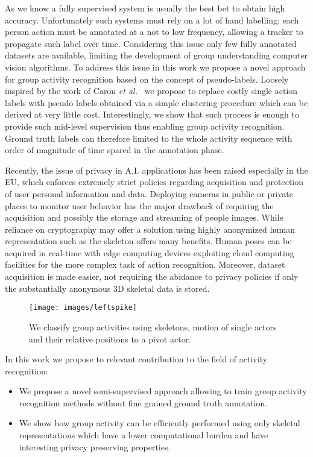 \documentclass[a4paper,conference]{IEEEtran}
\newcommand{\etal}{\textit{et al.}~}
\begin{document}
As we know a fully supervised system is usually the best bet to obtain high accuracy. Unfortunately such systems must rely on a lot of hand labelling: each person action must be annotated at a not to low frequency, allowing a tracker to propagate such label over time. Considering this issue only few fully annotated datasets are available, limiting the development of group understanding computer vision algorithms. To address this issue in this work we propose a novel approach for group activity recognition based on the concept of pseudo-labels. Loosely inspired by the work of Caron \etal \cite{caron2018deep} we propose to replace costly single action labels with pseudo labels obtained via a simple clustering procedure which can be derived at very little cost. Interestingly, we show that such process is enough to provide such mid-level supervision thus enabling group activity recognition. Ground truth labels can therefore limited to the whole activity sequence with order of magnitude of time spared in the annotation phase.

Recently, the issue of privacy in A.I. applications has been raised especially in the EU, which enforces extremely strict policies regarding acquisition and protection of user personal information and data. Deploying cameras in public or private places to monitor user behavior has the major drawback of requiring the acquisition and possibly the storage and streaming of people images. While reliance on cryptography may offer a solution using highly anonymized human representation such as the skeleton offers many benefits. Human poses can be acquired in real-time with edge computing devices exploiting cloud computing facilities for the more complex task of action recognition. Moreover, dataset acquisition is made easier, not requiring the abidance to privacy policies if only the substantially anonymous 3D skeletal data is stored.

\begin{figure}[t]
    \texttt{[image: images/leftspike]}
	\caption{We classify group activities using skeletons, motion of single actors and their relative positions to a pivot actor.}
	\label{fig:eye}
\end{figure}
	
In this work we propose to relevant contribution to the field of activity recognition:
\begin{itemize}
	\item  We propose a novel semi-supervised approach allowing to train group activity recognition methods without fine grained ground truth annotation.
	\item We show how group activity can be efficiently performed using only skeletal representations which have a lower computational burden and have interesting privacy preserving properties.
\end{itemize}
\end{document}

